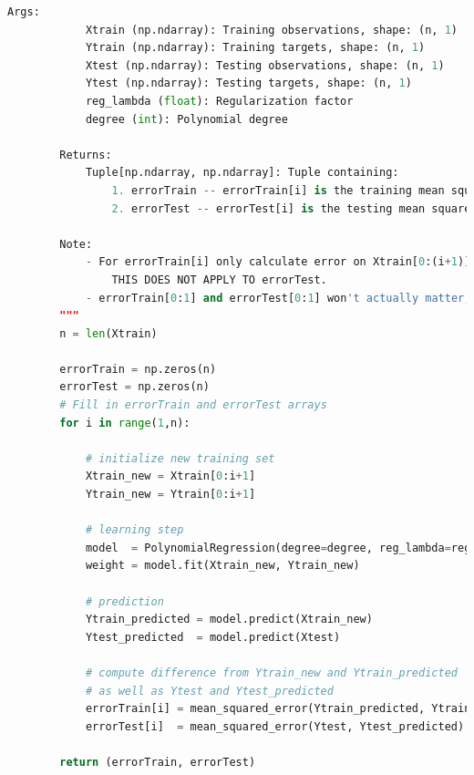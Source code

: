 \documentclass{article}
\begin{document}
\begin{lstlisting}[language=Python]
        Args:
            Xtrain (np.ndarray): Training observations, shape: (n, 1)
            Ytrain (np.ndarray): Training targets, shape: (n, 1)
            Xtest (np.ndarray): Testing observations, shape: (n, 1)
            Ytest (np.ndarray): Testing targets, shape: (n, 1)
            reg_lambda (float): Regularization factor
            degree (int): Polynomial degree

        Returns:
            Tuple[np.ndarray, np.ndarray]: Tuple containing:
                1. errorTrain -- errorTrain[i] is the training mean squared error using model trained by Xtrain[0:(i+1)]
                2. errorTest -- errorTest[i] is the testing mean squared error using model trained by Xtrain[0:(i+1)]

        Note:
            - For errorTrain[i] only calculate error on Xtrain[0:(i+1)], since this is the data used for training.
                THIS DOES NOT APPLY TO errorTest.
            - errorTrain[0:1] and errorTest[0:1] won't actually matter, since we start displaying the learning curve at n = 2 (or higher)
        """
        n = len(Xtrain)

        errorTrain = np.zeros(n)
        errorTest = np.zeros(n)
        # Fill in errorTrain and errorTest arrays
        for i in range(1,n):

            # initialize new training set
            Xtrain_new = Xtrain[0:i+1]
            Ytrain_new = Ytrain[0:i+1]

            # learning step
            model  = PolynomialRegression(degree=degree, reg_lambda=reg_lambda)
            weight = model.fit(Xtrain_new, Ytrain_new)

            # prediction
            Ytrain_predicted = model.predict(Xtrain_new)
            Ytest_predicted  = model.predict(Xtest)

            # compute difference from Ytrain_new and Ytrain_predicted
            # as well as Ytest and Ytest_predicted
            errorTrain[i] = mean_squared_error(Ytrain_predicted, Ytrain_new)
            errorTest[i]  = mean_squared_error(Ytest, Ytest_predicted)

        return (errorTrain, errorTest)

\end{lstlisting}
\end{document}
